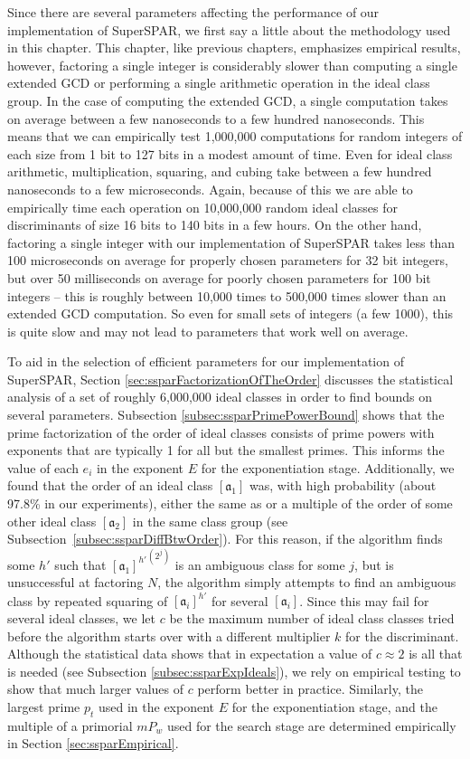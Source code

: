 \documentclass{ucalgthes1}
\theoremstyle{definition}
\newcommand{\ideal}{\mathfrak}
\begin{document}
Since there are several parameters affecting the performance of our implementation of SuperSPAR, we first say a little about the methodology used in this chapter.  This chapter, like previous chapters, emphasizes empirical results, however, factoring a single integer is considerably slower than computing a single extended GCD or performing a single arithmetic operation in the ideal class group.  In the case of computing the extended GCD, a single computation takes on average between a few nanoseconds to a few hundred nanoseconds.  This means that we can empirically test 1,000,000 computations for random integers of each size from 1 bit to 127 bits in a modest amount of time.  Even for ideal class arithmetic, multiplication, squaring, and cubing take between a few hundred nanoseconds to a few microseconds.  Again, because of this we are able to empirically time each operation on 10,000,000 random ideal classes for discriminants of size 16 bits to 140 bits in a few hours.  On the other hand, factoring a single integer with our implementation of SuperSPAR takes less than 100 microseconds on average for properly chosen parameters for 32 bit integers, but over 50 milliseconds on average for poorly chosen parameters for 100 bit integers -- this is roughly between 10,000 times to 500,000 times slower than an extended GCD computation.  So even for small sets of integers (a few 1000), this is quite slow and may not lead to parameters that work well on average.

To aid in the selection of efficient parameters for our implementation of SuperSPAR, Section \ref{sec:ssparFactorizationOfTheOrder} discusses the statistical analysis of a set of roughly 6,000,000 ideal classes in order to find bounds on several parameters.  Subsection \ref{subsec:ssparPrimePowerBound} shows that the prime factorization of the order of ideal classes consists of prime powers with exponents that are typically 1 for all but the smallest primes.  This informs the value of each $e_i$ in the exponent $E$ for the exponentiation stage.  Additionally, we found that the order of an ideal class $[\ideal a_1]$ was, with high probability (about 97.8\% in our experiments), either the same as or a multiple of the order of some other ideal class $[\mathfrak a_2]$ in the same class group (see Subsection~\ref{subsec:ssparDiffBtwOrder}).  For this reason, if the algorithm finds some $h'$ such that ${[\mathfrak a_1]^{h'}}^{\left(2^j\right)}$ is an ambiguous class for some $j$, but is unsuccessful at factoring $N$, the algorithm simply attempts to find an ambiguous class by repeated squaring of $[\mathfrak a_i]^{h'}$ for several $[\mathfrak a_i]$.  Since this may fail for several ideal classes, we let $c$ be the maximum number of ideal class classes tried before the algorithm starts over with a different multiplier $k$ for the discriminant.  Although the statistical data shows that in expectation a value of $c \approx 2$ is all that is needed (see Subsection \ref{subsec:ssparExpIdeals}), we rely on empirical testing to show that much larger values of $c$ perform better in practice.  Similarly, the largest prime $p_t$ used in the exponent $E$ for the exponentiation stage, and the multiple of a primorial $mP_w$ used for the search stage are determined empirically in Section \ref{sec:ssparEmpirical}.
\end{document}
